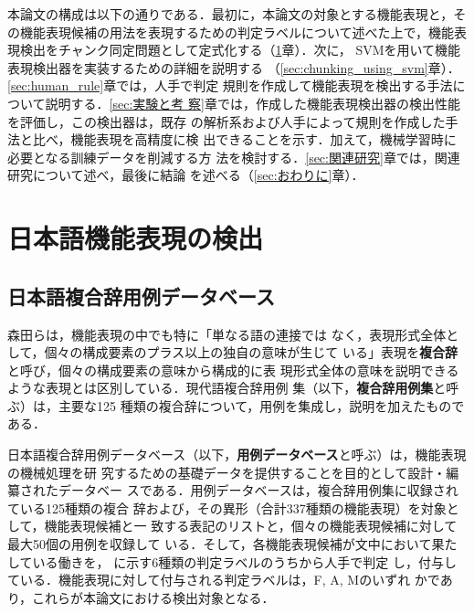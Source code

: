 \documentclass[japanese]{jnlp_1.2d}
\newcommand{\tabref}[1]{}
\begin{document}
本論文の構成は以下の通りである．最初に，本論文の対象とする機能表現と，そ
の機能表現候補の用法を表現するための判定ラベルについて述べた上で，機能表
現検出をチャンク同定問題として定式化する（\ref{sec:detection}章）．次に，
SVMを用いて機能表現検出器を実装するための詳細を説明する
（\ref{sec:chunking_using_svm}章）．\ref{sec:human_rule}章では，人手で判定
規則を作成して機能表現を検出する手法について説明する．\ref{sec:実験と考
察}章では，作成した機能表現検出器の検出性能を評価し，この検出器は，既存
の解析系および人手によって規則を作成した手法と比べ，機能表現を高精度に検
出できることを示す．加えて，機械学習時に必要となる訓練データを削減する方
法を検討する．\ref{sec:関連研究}章では，関連研究について述べ，最後に結論
を述べる（\ref{sec:おわりに}章）．


\section{日本語機能表現の検出}
\label{sec:detection}

\subsection{日本語複合辞用例データベース}

森田ら\cite{日本語表現文型}は，機能表現の中でも特に「単なる語の連接では
なく，表現形式全体として，個々の構成要素のプラス以上の独自の意味が生じて
いる」表現を{\bfseries 複合辞}と呼び，個々の構成要素の意味から構成的に表
現形式全体の意味を説明できるような表現とは区別している．現代語複合辞用例
集\cite{複合辞用例集}（以下，{\bfseries 複合辞用例集}と呼ぶ）は，主要な125
種類の複合辞について，用例を集成し，説明を加えたものである．

日本語複合辞用例データベース\cite{日本語複合辞用例データベースの作成と分
析}（以下，{\bfseries 用例データベース}と呼ぶ）は，機能表現の機械処理を研
究するための基礎データを提供することを目的として設計・編纂されたデータベー
スである．用例データベースは，複合辞用例集に収録されている125種類の複合
辞および，その異形（合計337種類の機能表現）を対象として，機能表現候補と一
致する表記のリストと，個々の機能表現候補に対して最大50個の用例を収録して
いる．そして，各機能表現候補が文中において果たしている働きを，
\tabref{tbl:判定ラベル体系}に示す6種類の判定ラベルのうちから人手で判定
し，付与している．機能表現に対して付与される判定ラベルは，F, A, Mのいずれ
かであり，これらが本論文における検出対象となる．
\end{document}
